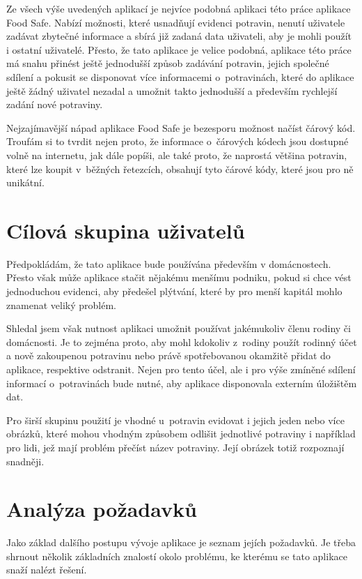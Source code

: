 \documentclass[thesis=B,czech]{FITthesis}[2013/10/20]
\begin{document}
Ze všech výše uvedených aplikací je nejvíce podobná aplikaci této práce aplikace Food Safe. Nabízí možnosti, které usnadňují evidenci potravin, nenutí uživatele zadávat zbytečné informace a sbírá již zadaná data uživateli, aby je mohli použít i ostatní uživatelé. Přesto, že tato aplikace je velice podobná, aplikace této práce má snahu přinést ještě jednodušší způsob zadávání potravin, jejich společné sdílení a pokusit se disponovat více informacemi o~potravinách, které do aplikace ještě žádný uživatel nezadal a umožnit takto jednodušší a především rychlejší zadání nové potraviny.

Nejzajímavější nápad aplikace Food Safe je bezesporu možnost načíst čárový kód. Troufám si to tvrdit nejen proto, že informace o~čárových kódech jsou dostupné volně na internetu, jak dále popíši, ale také proto, že naprostá většina potravin, které lze koupit v~běžných řetezcích, obsahují tyto čárové kódy, které jsou pro ně unikátní.

\section{Cílová skupina uživatelů}

Předpokládám, že tato aplikace bude používána především v domácnostech. Přesto však může aplikace stačit nějakému menšímu podniku, pokud si chce vést jednoduchou evidenci, 
aby předešel plýtvání, které by pro menší kapitál mohlo znamenat veliký problém.

Shledal jsem však nutnost aplikaci umožnit používat jakémukoliv členu rodiny či domácnosti. Je to zejména proto, aby mohl kdokoliv z~rodiny použít rodinný účet a nově zakoupenou potravinu nebo právě spotřebovanou okamžitě přidat do aplikace, respektive odstranit. Nejen pro tento účel, ale i pro výše zmíněné sdílení informací o~potravinách bude nutné, aby aplikace disponovala externím úložištěm dat.

Pro širší skupinu použití je vhodné u~potravin evidovat i jejich jeden nebo více obrázků, které mohou vhodným způsobem odlišit jednotlivé potraviny i například pro lidi, jež mají problém přečíst název potraviny. Její obrázek totiž rozpoznají snadněji.

\clearpage

\section{Analýza požadavků}

Jako základ dalšího postupu vývoje aplikace je seznam jejích požadavků. Je třeba shrnout několik základních znalostí okolo problému, ke kterému se tato aplikace snaží nalézt řešení.
\end{document}
